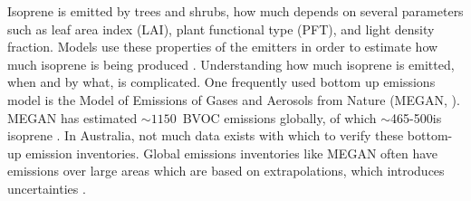     Isoprene is emitted by trees and shrubs, how much depends on several parameters such as leaf area index (LAI), plant functional type (PFT), and light density fraction.
    Models use these properties of the emitters in order to estimate how much isoprene is being produced \parencite[eg.][]{Guenther1995,Guenther2006}.
    Understanding how much isoprene is emitted, when and by what, is complicated.
    One frequently used bottom up emissions model is the Model of Emissions of Gases and Aerosols from Nature (MEGAN, \textcite{Guenther1995}).
    MEGAN has estimated $\sim 1150$\tgcpyr ~BVOC emissions globally, of which $\sim$465-500\tgcpyr is isoprene \parencite{Guenther2006, Messina2016}. 
    In Australia, not much data exists with which to verify these bottom-up emission inventories.
    Global emissions inventories like MEGAN often have emissions over large areas which are based on extrapolations, which introduces uncertainties \parencite{Miller2014}.
    
    
